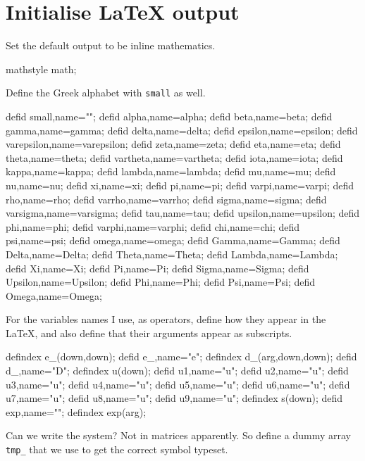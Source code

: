 \documentclass[11pt,a5paper]{article}
\def\eps{\varepsilon}
\begin{document}
\section{Initialise LaTeX output}

Set the default output to be inline mathematics.
\begin{reduce}
mathstyle math;
\end{reduce}

Define the Greek alphabet with \verb|small| as well.
\begin{reduce}
defid small,name="\eps";%
defid alpha,name=alpha;
defid beta,name=beta;
defid gamma,name=gamma;
defid delta,name=delta;
defid epsilon,name=epsilon;
defid varepsilon,name=varepsilon;
defid zeta,name=zeta;
defid eta,name=eta;
defid theta,name=theta;
defid vartheta,name=vartheta;
defid iota,name=iota;
defid kappa,name=kappa;
defid lambda,name=lambda;
defid mu,name=mu;
defid nu,name=nu;
defid xi,name=xi;
defid pi,name=pi;
defid varpi,name=varpi;
defid rho,name=rho;
defid varrho,name=varrho;
defid sigma,name=sigma;
defid varsigma,name=varsigma;
defid tau,name=tau;
defid upsilon,name=upsilon;
defid phi,name=phi;
defid varphi,name=varphi;
defid chi,name=chi;
defid psi,name=psi;
defid omega,name=omega;
defid Gamma,name=Gamma;
defid Delta,name=Delta;
defid Theta,name=Theta;
defid Lambda,name=Lambda;
defid Xi,name=Xi;
defid Pi,name=Pi;
defid Sigma,name=Sigma;
defid Upsilon,name=Upsilon;
defid Phi,name=Phi;
defid Psi,name=Psi;
defid Omega,name=Omega;
\end{reduce}

For the variables names I use, as operators, define how they appear in the \LaTeX, and also define that their arguments appear as subscripts.
\begin{reduce}
defindex e_(down,down);
defid e_,name="e";
defindex d_(arg,down,down);
defid d_,name="D";
defindex u(down);
defid u1,name="u"; 
defid u2,name="u"; 
defid u3,name="u"; 
defid u4,name="u"; 
defid u5,name="u"; 
defid u6,name="u"; 
defid u7,name="u"; 
defid u8,name="u"; 
defid u9,name="u"; 
defindex s(down);
defid exp,name="\exp";
defindex exp(arg);
\end{reduce}

Can we write the system? Not in matrices apparently. So
define a dummy array \verb|tmp_| that we use to get the
correct symbol typeset.
\end{document}
